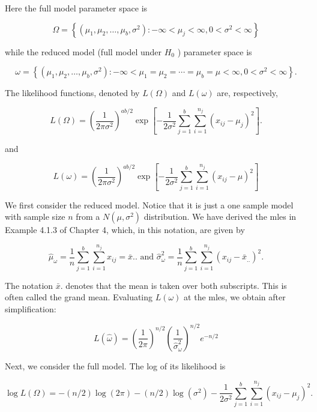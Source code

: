 Here the full model parameter space is

$$
\Omega=\left\{\left(\mu_{1}, \mu_{2}, \ldots, \mu_{b}, \sigma^{2}\right):-\infty<\mu_{j}<\infty, 0<\sigma^{2}<\infty\right\}
$$

while the reduced model (full model under $H_{0}$ ) parameter space is

$$
\omega=\left\{\left(\mu_{1}, \mu_{2}, \ldots, \mu_{b}, \sigma^{2}\right):-\infty<\mu_{1}=\mu_{2}=\cdots=\mu_{b}=\mu<\infty, 0<\sigma^{2}<\infty\right\} .
$$

The likelihood functions, denoted by $L(\Omega)$ and $L(\omega)$ are, respectively,

$$
L(\Omega)=\left(\frac{1}{2 \pi \sigma^{2}}\right)^{a b / 2} \exp \left[-\frac{1}{2 \sigma^{2}} \sum_{j=1}^{b} \sum_{i=1}^{n_{j}}\left(x_{i j}-\mu_{j}\right)^{2}\right] .
$$

and

$$
L(\omega)=\left(\frac{1}{2 \pi \sigma^{2}}\right)^{a b / 2} \exp \left[-\frac{1}{2 \sigma^{2}} \sum_{j=1}^{b} \sum_{i=1}^{n_{j}}\left(x_{i j}-\mu\right)^{2}\right]
$$

We first consider the reduced model. Notice that it is just a one sample model with sample size $n$ from a $N\left(\mu, \sigma^{2}\right)$ distribution. We have derived the mles in Example 4.1.3 of Chapter 4, which, in this notation, are given by


\begin{equation*}
\hat{\mu}_{\omega}=\frac{1}{n} \sum_{j=1}^{b} \sum_{i=1}^{n_{j}} x_{i j}=\bar{x} . . \text { and } \hat{\sigma}_{\omega}^{2}=\frac{1}{n} \sum_{j=1}^{b} \sum_{i=1}^{n_{j}}\left(x_{i j}-\bar{x}_{. .}\right)^{2} . \tag{9.2.3}
\end{equation*}


The notation $\bar{x}$. denotes that the mean is taken over both subscripts. This is often called the grand mean. Evaluating $L(\omega)$ at the mles, we obtain after simplification:


\begin{equation*}
L(\hat{\omega})=\left(\frac{1}{2 \pi}\right)^{n / 2}\left(\frac{1}{\hat{\sigma}_{\omega}^{2}}\right)^{n / 2} e^{-n / 2} \tag{9.2.4}
\end{equation*}


Next, we consider the full model. The log of its likelihood is


\begin{equation*}
\log L(\Omega)=-(n / 2) \log (2 \pi)-(n / 2) \log \left(\sigma^{2}\right)-\frac{1}{2 \sigma^{2}} \sum_{j=1}^{b} \sum_{i=1}^{n_{j}}\left(x_{i j}-\mu_{j}\right)^{2} . \tag{9.2.5}
\end{equation*}


